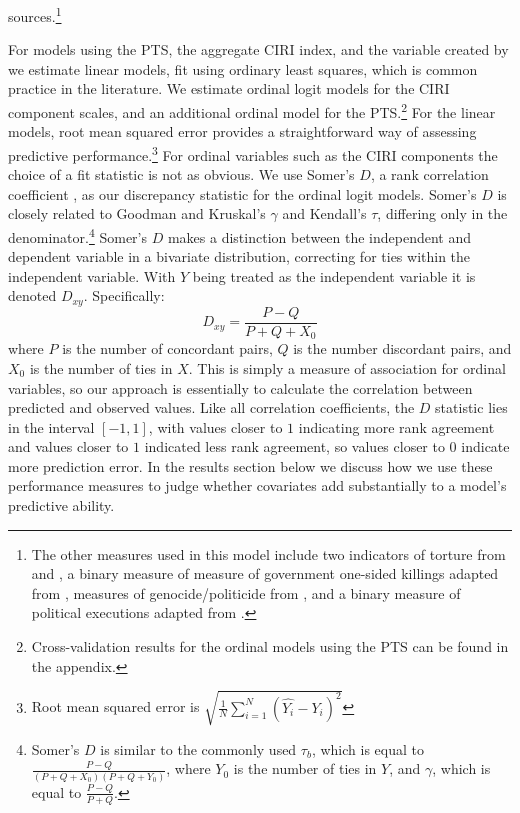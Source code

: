 \documentclass[11pt]{article}
\begin{document}
sources.\footnote{The other measures used in this model include two indicators of torture from \citet{Hathaway2002} and \citet{ConradHaglundMoore2012}, a binary measure of measure of government one-sided killings adapted from \citet{EckHultman2007}, measures of genocide/politicide from \citet{HarffGurr1988,Rummel1995,MarshallHarffGurr2009}, and a binary measure of political executions adapted from \citet{TaylorJodice1983}.}

For models using the PTS, the aggregate CIRI index, and the variable created by \citet{Fariss2013} we estimate linear models, fit using ordinary least squares, which is common practice in the literature. We estimate ordinal logit models for the CIRI component scales, and an additional ordinal model for the PTS.\footnote{Cross-validation results for the ordinal models using the PTS can be found in the appendix.} For the linear models, root mean squared error provides a straightforward way of assessing predictive performance.\footnote{Root mean squared error is $\displaystyle \sqrt{\frac{1}{N} \sum\limits_{i=1}^N (\hat{Y_{i}} - Y_{i})^2} $} For ordinal variables such as the CIRI components the choice of a fit statistic is not as obvious. We use Somer's $D$, a rank correlation coefficient  \citep{Somers1962}, as our discrepancy statistic for the ordinal logit models.
Somer's $D$ is closely related to Goodman and Kruskal's $\gamma$ and Kendall's $\tau$, differing only in the denominator.\footnote{Somer's $D$ is similar to the commonly used $\tau_b$, which is equal to $\frac{P - Q}{(P+Q+X_0)(P+Q+Y_0)}$, where $Y_0$ is the number of ties in $Y$, and $\gamma$, which is equal to $\frac{P - Q}{P + Q}$.} Somer's $D$ makes a distinction between the independent and dependent variable in a bivariate distribution, correcting for ties within the independent variable. With $Y$ being treated as the independent variable it is denoted $D_{xy}$. 
Specifically:
$$D_{xy} = \frac{P - Q}{P + Q + X_0}$$
\noindent where $P$ is the number of concordant pairs, $Q$ is the number discordant pairs, and $X_0$ is the number of ties in $X$. This is simply a measure of association for ordinal variables, so our approach is essentially to calculate the correlation between predicted and observed values. Like all correlation coefficients, the $D$ statistic lies in the interval $[-1, 1]$, with values closer to $1$ indicating more rank agreement and values closer to $1$ indicated less rank agreement, so values closer to 0 indicate more prediction error. In the results section below we discuss how we use these performance measures to judge whether covariates add substantially to a model's predictive ability.
\end{document}
